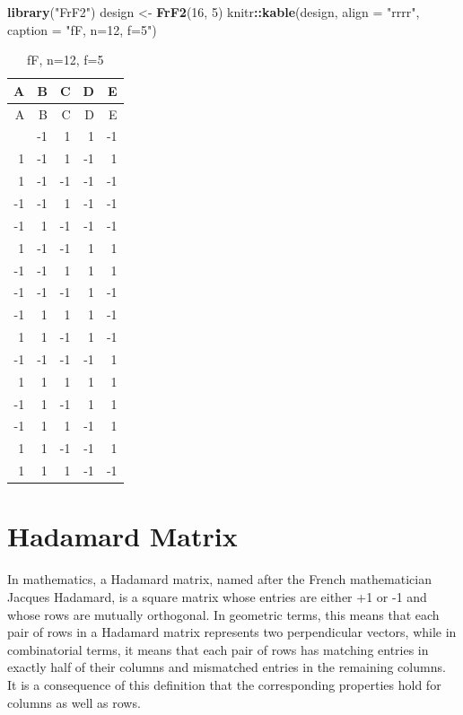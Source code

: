 \documentclass[
  12pt,
  a4paper,
]{article}
\newenvironment{Shaded}{\begin{snugshade}}{\end{snugshade}}
\newcommand{\AttributeTok}[1]{\textcolor[rgb]{0.13,0.29,0.53}{#1}}
\newcommand{\DecValTok}[1]{\textcolor[rgb]{0.00,0.00,0.81}{#1}}
\newcommand{\FunctionTok}[1]{\textcolor[rgb]{0.13,0.29,0.53}{\textbf{#1}}}
\newcommand{\NormalTok}[1]{#1}
\newcommand{\OtherTok}[1]{\textcolor[rgb]{0.56,0.35,0.01}{#1}}
\newcommand{\SpecialCharTok}[1]{\textcolor[rgb]{0.81,0.36,0.00}{\textbf{#1}}}
\newcommand{\StringTok}[1]{\textcolor[rgb]{0.31,0.60,0.02}{#1}}
\numberwithin{equation}{section}
\theoremstyle{plain}
\theoremstyle{definition}
\theoremstyle{remark}
\theoremstyle{note}
\begin{document}
\begin{Shaded}
\begin{Highlighting}[]
\FunctionTok{library}\NormalTok{(}\StringTok{"FrF2"}\NormalTok{)}
\NormalTok{design }\OtherTok{\textless{}{-}} \FunctionTok{FrF2}\NormalTok{(}\DecValTok{16}\NormalTok{, }\DecValTok{5}\NormalTok{)}
\NormalTok{knitr}\SpecialCharTok{::}\FunctionTok{kable}\NormalTok{(design, }\AttributeTok{align =} \StringTok{"rrrr"}\NormalTok{, }\AttributeTok{caption =} \StringTok{"fF, n=12, f=5"}\NormalTok{)}
\end{Highlighting}
\end{Shaded}

\begin{longtable}[]{@{}rrrrr@{}}
\caption{fF, n=12, f=5}\tabularnewline
\toprule\noalign{}
A & B & C & D & E \\
\midrule\noalign{}
\endfirsthead
\toprule\noalign{}
A & B & C & D & E \\
\midrule\noalign{}
\endhead
\bottomrule\noalign{}
\endlastfoot
1 & -1 & 1 & 1 & -1 \\
1 & -1 & 1 & -1 & 1 \\
1 & -1 & -1 & -1 & -1 \\
-1 & -1 & 1 & -1 & -1 \\
-1 & 1 & -1 & -1 & -1 \\
1 & -1 & -1 & 1 & 1 \\
-1 & -1 & 1 & 1 & 1 \\
-1 & -1 & -1 & 1 & -1 \\
-1 & 1 & 1 & 1 & -1 \\
1 & 1 & -1 & 1 & -1 \\
-1 & -1 & -1 & -1 & 1 \\
1 & 1 & 1 & 1 & 1 \\
-1 & 1 & -1 & 1 & 1 \\
-1 & 1 & 1 & -1 & 1 \\
1 & 1 & -1 & -1 & 1 \\
1 & 1 & 1 & -1 & -1 \\
\end{longtable}

\newpage

\hypertarget{hadamard-matrix}{%
\section{Hadamard Matrix}\label{hadamard-matrix}}

In mathematics, a Hadamard matrix, named after the French mathematician
Jacques Hadamard, is a square matrix whose entries are either +1 or -1
and whose rows are mutually orthogonal. In geometric terms, this means
that each pair of rows in a Hadamard matrix represents two perpendicular
vectors, while in combinatorial terms, it means that each pair of rows
has matching entries in exactly half of their columns and mismatched
entries in the remaining columns. It is a consequence of this definition
that the corresponding properties hold for columns as well as rows.
\end{document}
